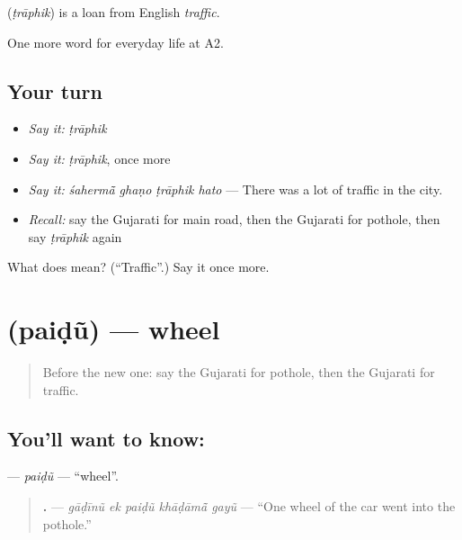 \begin{cousinweb}
\textbf{} (\emph{ṭrāphik}) is a loan from English \emph{traffic}.
\end{cousinweb}

\begin{grammarlens}[title={What you've built}]
One more word for everyday life at A2.
\end{grammarlens}

\subsection*{Your turn}
\begin{itemize}
\raggedright
  \item \emph{Say it:} \emph{ṭrāphik}
  \item \emph{Say it:} \emph{ṭrāphik}, once more
  \item \emph{Say it:} \emph{śahermā̃ ghaṇo ṭrāphik hato} — There was a lot of traffic in the city.
  \item \emph{Recall:} say the Gujarati for main road, then the Gujarati for pothole, then say \emph{ṭrāphik} again
\end{itemize}

\begin{tcolorbox}[breakable,colback=teal!4,colframe=teal!35!black,title={Before you move on}]
What does  mean? (\textquotedblleft{}Traffic\textquotedblright{}.) Say it once more.
\end{tcolorbox}
\section[\texorpdfstring{\gu{પૈડું} (paiḍũ)}{પૈડું (paiḍũ)}]{ (paiḍũ) — wheel}

\label{lesson:GU-C208-paidu}



\begin{quote}
Before the new one: say the Gujarati for pothole, then the Gujarati for traffic.
\end{quote}

\subsection*{You'll want to know: }
\textbf{} — \emph{paiḍũ} — \textquotedblleft{}wheel\textquotedblright{}.

\begin{quote}
\textbf{    .} — \emph{gāḍīnũ ek paiḍũ khāḍāmā̃ gayũ} — \textquotedblleft{}One wheel of the car went into the pothole.\textquotedblright{}
\end{quote}

